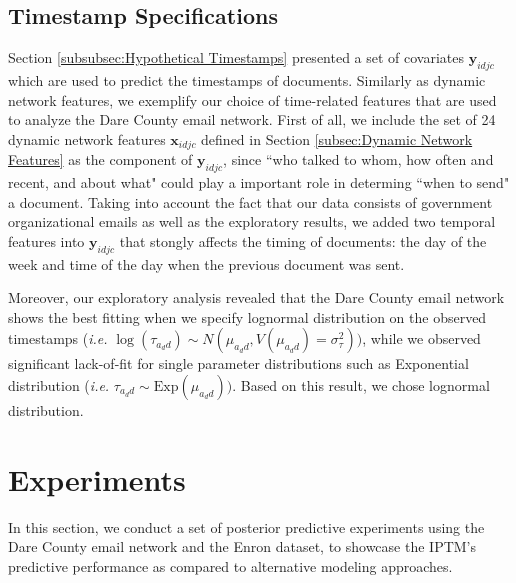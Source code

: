 \documentclass[twoside]{article}
\begin{document}
\subsection{Timestamp Specifications}\label{subsec:Timestamp Specifications}
Section \ref{subsubsec:Hypothetical Timestamps} presented a set of covariates $\boldsymbol{y}_{idjc}$ which are used to predict the timestamps of documents. Similarly as dynamic network features, we exemplify our choice of time-related features that are used to analyze the Dare County email network. First of all, we include the set of 24 dynamic network features $\boldsymbol{x}_{idjc}$ defined in Section \ref{subsec:Dynamic Network Features} as the component of $\boldsymbol{y}_{idjc}$, since ``who talked to whom, how often and recent, and about what" could play a important role in determing ``when to send" a document. Taking into account the fact that our data consists of government organizational emails as well as the exploratory results, we added two temporal features into $\boldsymbol{y}_{idjc}$ that stongly affects the timing of documents: the day of the week and time of the day when the previous document was sent. 

Moreover, our exploratory analysis revealed that the Dare County email network shows the best fitting when we specify lognormal distribution on the observed timestamps (\textit{i.e.} $\log(\tau_{a_dd}) \sim N(\mu_{a_d d}, V(\mu_{a_d d}) = \sigma^2_\tau))$, while we observed significant lack-of-fit for single parameter distributions such as Exponential distribution (\textit{i.e.} $\tau_{a_dd} \sim \mbox{Exp}(\mu_{a_d d}))$. Based on this result, we chose lognormal distribution. 

\section{Experiments}\label{sec:Experiments}
In this section, we conduct a set of posterior predictive experiments using the Dare County email network and the Enron dataset, to showcase the IPTM's predictive performance as compared to alternative modeling approaches.
\end{document}
